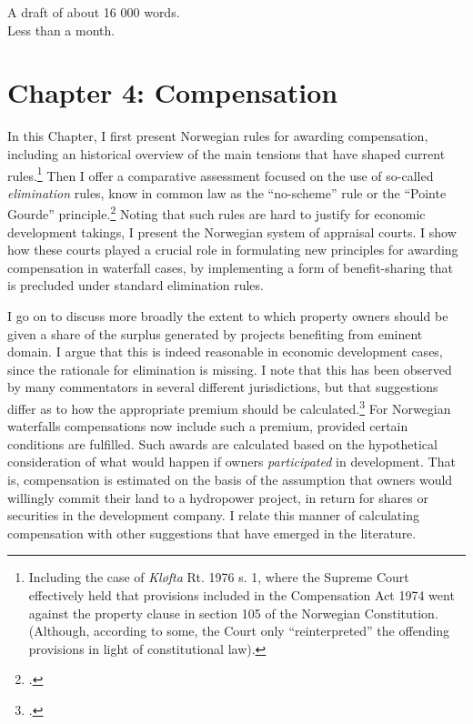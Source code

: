 \documentclass[12pt,a4paper]{article} %
\begin{document}
 A draft of about 16 000 words. \\

 Less than a month.

\section*{Chapter 4: Compensation}\label{chap:4}

In this Chapter, I first present Norwegian rules for awarding compensation, including an historical overview of the main tensions that have shaped current rules.\footnote{Including the case of {\it Kløfta} Rt. 1976 s. 1, where the Supreme Court effectively held that provisions included in the Compensation Act 1974 went against the property clause in section 105 of the Norwegian Constitution. (Although, according to some, the Court only ``reinterpreted'' the offending provisions in light of constitutional law).} Then I offer a comparative assessment focused on the use of so-called {\it elimination} rules, know in common law as the ``no-scheme'' rule or the ``Pointe Gourde'' principle.\footcite{gourde47} Noting that such rules are hard to justify for economic development takings, I present the Norwegian system of appraisal courts. I show how these courts played a crucial role in formulating new principles for awarding compensation in waterfall cases, by implementing a form of benefit-sharing that is precluded under standard elimination rules.

I go on to discuss more broadly the extent to which property owners should be given a share of the surplus generated by projects benefiting from eminent domain. I argue that this is indeed reasonable in economic development cases, since the rationale for elimination is missing. I note that this has been observed by many commentators in several different jurisdictions, but that suggestions differ as to how the appropriate premium should be calculated.\footcite{lehavi07,crow07,stenseth10} For Norwegian waterfalls compensations now include such a premium, provided certain conditions are fulfilled. Such awards are calculated based on the hypothetical consideration of what would happen if owners {\it participated} in development. That is, compensation is estimated on the basis of the assumption that owners would willingly commit their land to a hydropower project, in return for shares or securities in the development company. I relate this manner of calculating compensation with other suggestions that have emerged in the literature.
\end{document}
